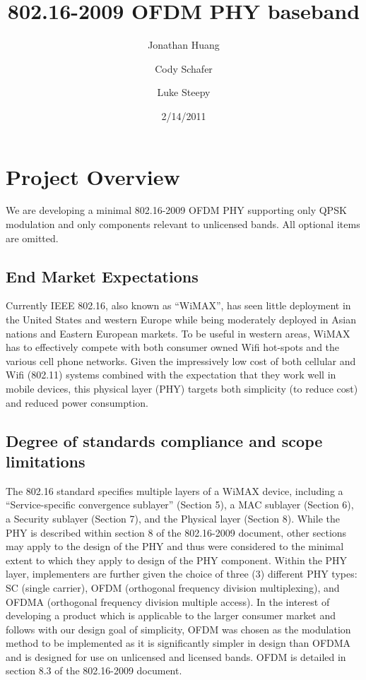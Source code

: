 \documentclass[10pt]{article}
\title{802.16-2009 OFDM PHY baseband}
\author{Jonathan Huang \and Cody Schafer \and Luke Steepy}
\date{2/14/2011}
\begin{document}
\maketitle
\section{Project Overview}
We are developing a minimal 802.16-2009 OFDM PHY supporting only QPSK
modulation and only components relevant to unlicensed bands. All
optional items are omitted.

	\subsection{End Market Expectations}
	Currently IEEE 802.16, also known as ``WiMAX'', has seen little deployment in the
	United States and western Europe while being moderately deployed in Asian
	nations and Eastern European markets. To be useful in western areas, WiMAX has
	to effectively compete with both consumer owned Wifi hot-spots and the various
	cell phone networks. Given the impressively low cost of both cellular and Wifi
	(802.11) systems combined with the expectation that they work well in mobile
	devices, this physical layer (PHY) targets both simplicity (to reduce cost) and
	reduced power consumption.

	\subsection{Degree of standards compliance and scope limitations}
	The 802.16 standard specifies multiple layers of a WiMAX device, including a
	``Service-specific convergence sublayer'' (Section 5), a MAC sublayer (Section
	6), a Security sublayer (Section 7), and the Physical layer (Section 8). While
	the PHY is described within section 8 of the 802.16-2009 document, other
	sections may apply to the design of the PHY and thus were considered to the
	minimal extent to which they apply to design of the PHY component.  Within the
	PHY layer, implementers are further given the choice of three (3) different PHY
	types: SC (single carrier), OFDM (orthogonal frequency division multiplexing),
	and OFDMA (orthogonal frequency division multiple access). In the interest of
	developing a product which is applicable to the larger consumer market and
	follows with our design goal of simplicity, OFDM was chosen as the modulation
	method to be implemented as it is significantly simpler in design than OFDMA
	and is designed for use on unlicensed and licensed bands. OFDM is detailed in
	section 8.3 of the 802.16-2009 document.
\end{document}
